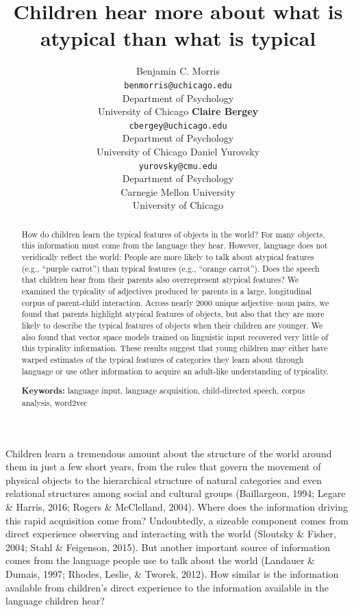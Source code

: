 \documentclass[10pt, letterpaper]{article}
\title{Children hear more about what is atypical than what is typical}
\author{Benjamin C. Morris \\
      \texttt{benmorris@uchicago.edu} \\
     Department of Psychology \\ University of Chicago
\And \textbf{Claire Bergey} \\
     \texttt{cbergey@uchicago.edu} \\
     Department of Psychology \\ University of Chicago
\And Daniel Yurovsky \\
     \texttt{yurovsky@cmu.edu} \\
     Department of Psychology \\ Carnegie Mellon University \\ University of Chicago}
\begin{document}
\maketitle

\begin{abstract}
How do children learn the typical features of objects in the world? For
many objects, this information must come from the language they hear.
However, language does not veridically reflect the world: People are
more likely to talk about atypical features (e.g., ``purple carrot'')
than typical features (e.g., ``orange carrot''). Does the speech that
children hear from their parents also overrepresent atypical features?
We examined the typicality of adjectives produced by parents in a large,
longitudinal corpus of parent-child interaction. Across nearly 2000
unique adjective--noun pairs, we found that parents highlight atypical
features of objects, but also that they are more likely to describe the
typical features of objects when their children are younger. We also
found that vector space models trained on linguistic input recovered
very little of this typicality information. These results suggest that
young children may either have warped estimates of the typical features
of categories they learn about through language or use other information
to acquire an adult-like understanding of typicality.

\textbf{Keywords:}
language input, language acquisition, child-directed speech, corpus
analysis, word2vec
\end{abstract}

Children learn a tremendous amount about the structure of the world
around them in just a few short years, from the rules that govern the
movement of physical objects to the hierarchical structure of natural
categories and even relational structures among social and cultural
groups (Baillargeon, 1994; Legare \& Harris, 2016; Rogers \& McClelland,
2004). Where does the information driving this rapid acquisition come
from? Undoubtedly, a sizeable component comes from direct experience
observing and interacting with the world (Sloutsky \& Fisher, 2004;
Stahl \& Feigenson, 2015). But another important source of information
comes from the language people use to talk about the world (Landauer \&
Dumais, 1997; Rhodes, Leslie, \& Tworek, 2012). How similar is the
information available from children's direct experience to the
information available in the language children hear?
\end{document}
